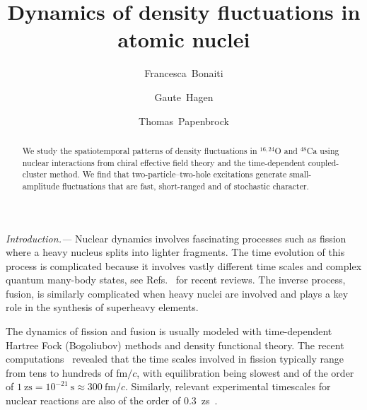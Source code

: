 \documentclass[aps,prc,twocolumn,showpacs,floatfix,nofootinbib,superscriptaddress,amsmath,amssymb,longbibliography,amsproc]{revtex4-2}
\begin{document}
\title{Dynamics of density fluctuations in atomic nuclei}

\author{Francesca~Bonaiti}

\author{Gaute~Hagen}

\author{Thomas~Papenbrock}

\begin{abstract}
We study the spatiotemporal patterns of density fluctuations in  $^{16,24}$O and $^{48}$Ca using nuclear interactions from chiral effective field theory and the time-dependent coupled-cluster method. We find that two-particle--two-hole excitations generate small-amplitude fluctuations that are fast, short-ranged and of stochastic character.
\end{abstract}
\maketitle

\textit{Introduction.---} Nuclear dynamics involves fascinating processes such as fission where a heavy nucleus splits into lighter fragments. The time evolution of this process is complicated because it involves vastly different time scales and complex quantum many-body states, see Refs.~\cite{simenel2018,sekizawa2019,schunck2022} for recent reviews. The inverse process, fusion, is similarly complicated when heavy nuclei are involved and plays a key role in the synthesis of superheavy elements.

The dynamics of fission and fusion is usually modeled with time-dependent Hartree Fock (Bogoliubov) methods and density functional theory. The recent computations~\cite{goddard2015,bulgac2016,sekizawa2016,goddard2020,hasegawa2020,abdurrahman2024} revealed that the time scales involved in fission typically range from tens to hundreds of fm$/c$, with equilibration being slowest and of the order of $1~\mathrm{zs}=10^{-21}~\mathrm{s}\approx 300~\mathrm{fm}/c$. Similarly, relevant experimental timescales for nuclear reactions are also of the order of 0.3~zs~\cite{jedele2017,simenel2020}.
\end{document}
